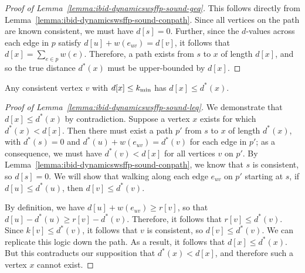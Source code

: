 \begin{proof}[Proof of Lemma~\ref{lemma:ibid-dynamicswsffp-sound-geq}]
This follows directly from
Lemma~\ref{lemma:ibid-dynamicswsffp-sound-conpath}.
Since all vertices on the path are known consistent,
we must have $d[s] = 0$.
Further,
since the $d$-values across each edge in $p$
satisfy $d[u] + w(e_{uv}) = d[v]$,
it follows that $d[x] = \sum_{e \in p} w(e)$.
Therefore,
a path exists from $s$ to $x$ of length $d[x]$,
and so the true distance $d^*(x)$ must be upper-bounded by $d[x]$.
\end{proof}

\begin{lemma}
Any consistent vertex $v$ with $d[x] \leq k_{\mbox{\scriptsize min}}$
has $d[x] \leq d^*(x)$.
\label{lemma:ibid-dynamicswsffp-sound-leq}
\end{lemma}

\begin{proof}[Proof of Lemma~\ref{lemma:ibid-dynamicswsffp-sound-leq}]
We demonstrate that $d[x] \leq d^*(x)$ by contradiction.
Suppose a vertex $x$ exists for which $d^*(x) < d[x]$.
Then there must exist a path $p'$ from $s$ to $x$ of length $d^*(x)$,
with $d^*(s) = 0$ and $d^*(u) + w(e_{uv}) = d^*(v)$ for each edge
in $p'$;
as a consequence,
we must have $d^*(v) < d[x]$ for all vertices $v$ on $p'$.
By Lemma~\ref{lemma:ibid-dynamicswsffp-sound-conpath},
we know that $s$ is consistent,
so $d[s] = 0$.
We will show that walking along
each edge $e_{uv}$ on $p'$ starting at $s$,
if $d[u] \leq d^*(u)$,
then $d[v] \leq d^*(v)$.

By definition,
we have $d[u] + w(e_{uv}) \geq r[v]$,
so that $d[u] - d^*(u) \geq r[v] - d^*(v)$.
Therefore,
it follows that $r[v] \leq d^*(v)$.
Since $k[v] \leq d^*(v)$,
it follows that $v$ is consistent,
so $d[v] \leq d^*(v)$.
We can replicate this logic down the path.
As a result,
it follows that $d[x] \leq d^*(x)$.
But this contraducts our supposition that $d^*(x) < d[x]$,
and therefore such a vertex $x$ cannot exist.
\end{proof}


